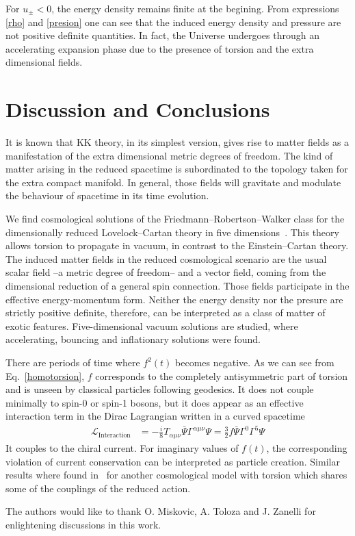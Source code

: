 \documentclass[aps,prd,12pt,superscriptaddress,showpacs,showkeys,longbibliography,reprint,nofootinbib]{revtex4-1}
\begin{document}
For $u_\pm<0$, the energy density remains finite at the begining. From expressions \eqref{rho} and \eqref{presion} one can see that the induced energy density and pressure are not positive definite quantities. In fact, the Universe undergoes through an accelerating expansion phase due to the presence of torsion and the extra dimensional fields. 


\section{Discussion and Conclusions\label{conclusions}}

It is known that KK theory, in its simplest version, gives rise to matter fields as a manifestation of the extra dimensional metric degrees of freedom. The kind of matter arising in the reduced spacetime is subordinated to the topology taken for the extra compact manifold. In general, those fields will gravitate and modulate the behaviour of spacetime in its time evolution. 

We find cosmological solutions of the Friedmann--Robertson--Walker class for the dimensionally reduced Lovelock--Cartan theory in five dimensions~\cite{Mardones:1990qc}. This theory allows torsion to propagate in vacuum, in contrast to the Einstein--Cartan theory. The induced matter fields in the reduced cosmological scenario are the usual scalar field --a metric degree of freedom-- and a vector field, coming from the dimensional reduction of a general spin connection. Those fields participate in the effective energy-momentum form. Neither the energy density nor the presure are strictly positive definite, therefore, can be interpreted as a class of matter of exotic features. Five-dimensional vacuum solutions are studied, where accelerating, bouncing and inflationary solutions were found.

There are periods of time where $f^2(t)$ becomes negative. As we can see from Eq.~\eqref{homotorsion}, $f$ corresponds to the completely antisymmetric part of torsion and is unseen by classical particles following geodesics. It does not couple minimally to spin-0 or spin-1 bosons, but it does appear as an effective interaction term in the Dirac Lagrangian written in a curved spacetime~\cite{Hehl:1976kj}
\begin{align*}
\mathcal{L}_{\text{Interaction}}&=-\frac{i}{8}T_{\alpha\mu\nu}\bar{\Psi}\Gamma^{\alpha\mu\nu}\Psi =\frac{3}{2}f\bar{\Psi}\Gamma^0\Gamma^5\Psi
\end{align*}
It couples to the chiral current. For imaginary values of $f(t)$, the corresponding violation of current conservation can be interpreted as particle creation. Similar results where found in~\cite{Toloza:2013wi} for another cosmological model with torsion which shares some of the couplings of the reduced action. 
\begin{acknowledgments}
The authors would like to thank O. Miskovic, A. Toloza and J. Zanelli for enlightening discussions in this work.
\end{acknowledgments}
\end{document}
